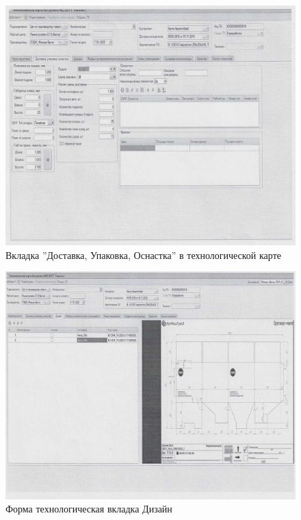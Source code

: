 \begin{figure}
\begin{center}
 \includegraphics[height=0.4\textheight, keepaspectratio]{Pics/II.4.jpg}
\end{center}
 \caption{Вкладка ''Доставка, Упаковка, Оснастка'' в технологической карте}
 \label{pic:II.4.}
\end{figure}

\begin{figure}
\begin{center}
 \includegraphics[height=0.4\textheight, keepaspectratio]{Pics/II.4..jpg}
\end{center}
 \caption{Форма технологическая вкладка Дизайн}
 \label{pic:II.4..}
\end{figure}


